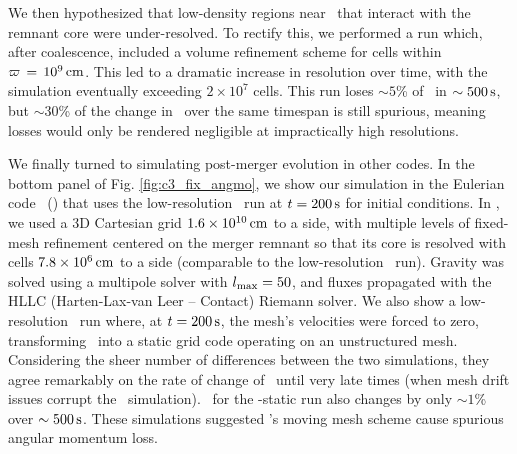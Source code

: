 
We then hypothesized that low-density regions near \innercyl\ that interact with the remnant core were under-resolved. To rectify this, we performed a run which, after coalescence, included a volume refinement scheme for cells within $\varpi\,=\,10^9\,\mathrm{cm}$.  This led to a dramatic increase in resolution over time, with the simulation eventually exceeding $2\times10^7$ cells.  This run loses $\sim5$\% of \Lztot\ in $\sim500\,\mathrm{s}$, but $\sim30$\% of the change in \Lzinner\ over the same timespan is still spurious, meaning losses would only be rendered negligible at impractically high resolutions.




We finally turned to simulating post-merger evolution in other codes.  In the bottom panel of Fig. \ref{fig:c3_fix_angmo}, we show our simulation in the Eulerian code \flash\ (\citealt{fryx+00, dube+09}) that uses the low-resolution \arepo\ run at $t = 200\,\mathrm{s}$ for initial conditions.  In \flash, we used a 3D Cartesian grid $1.6\times10^{10}\,\mathrm{cm}$ to a side, with multiple levels of fixed-mesh refinement centered on the merger remnant so that its core is resolved with cells $7.8\times10^6\,\mathrm{cm}$ to a side (comparable to the low-resolution \arepo\ run).  Gravity was solved using a multipole solver with $l_\mathrm{max} = 50$, and fluxes propagated with the HLLC (Harten-Lax-van Leer -- Contact) Riemann solver.  We also show a low-resolution \arepo\ run where, at $t = 200\,\mathrm{s}$, the mesh's velocities were forced to zero, transforming \arepo\ into a static grid code operating on an unstructured mesh.  Considering the sheer number of differences between the two simulations, they agree remarkably on the rate of change of \Lzinner\ until very late times (when mesh drift issues corrupt the \arepo\ simulation).  \Lztot\ for the \arepo-static run also changes by only $\sim1$\% over $\sim500\,\mathrm{s}$.  These simulations suggested \arepo's moving mesh scheme cause spurious angular momentum loss.

